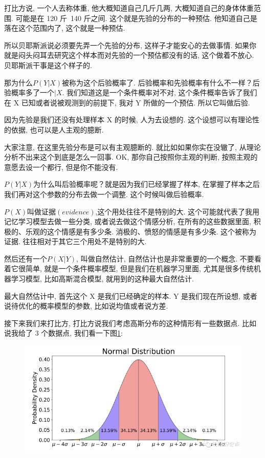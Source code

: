 打比方说, 一个人去称体重, 他大概知道自己几斤几两, 大概知道自己的身体体重范围. 可能是在 120 斤~140 斤之间. 这个就是先验的分布的一种预估. 他知道自己是落在这个范围内了, 这个就是一种预估. 

所以贝耶斯派说必须要先弄一个先验的分布, 这样子才能安心的去做事情. 如果你就是闷头闷耳去研究这个样本而对先验的一个预估都没有的话, 这个做着不放心. 贝耶斯派干事是这个样子的. 

那为什么$P(Y|X)$被称为这个后验概率了. 后验概率和先验概率有什么不一样？后验概率多了一个$|X$. 我们知道这是一个条件概率对不对, 这个条件概率告诉了我们在 X 已知或者说被观测到的前提下, 我对 Y 所做的一个预估. 所以它叫做后验. 

因为先验是我们还没有处理样本 X 的时候, 人为去设想的. 这个设想可以有理论性的依据, 也可以是人主观的臆断. 

大家注意, 在这里先验分布是可以有主观臆断的. 就比如如果你实在没辙了, 从理论分析不出来这个到底是怎么一回事. OK, 那你自己按照你主观的判断, 按照主观的意愿去设一个都行, 但是你不能没有. 

$P(Y|X)$为什么叫后验概率呢？就是因为我们已经掌握了样本, 在掌握了样本之后
我们再对这个参数的分布去做一个调整. 这个时候叫做后验概率. 

$P(X)$叫做证据$(\mathord{evidence})$,这个用处往往不是特别的大. 这个可能就代表了我用记忆学习模型去做一些分类, 或者说去做这个情感分析, 在所有的这些数据里面, 积极的、乐观的这个情感是有多少条. 消极的、愤怒的情感是有多少条. 这个被称为证据. 往往相对于其它三个用处不是特别的大. 

然后还有一个$P(X|Y)$, 叫做自然估计, 自然估计也是非常重要的一个概念. 不要看着它很简单, 就是一个条件概率模型, 但是我们在机器学习里面, 尤其是很多传统机器学习模型, 比如高斯混合模型, 就用到的这种最大自然估计. 

最大自然估计中, 首先这个 X 是我们已经确定的样本. Y 是我们现在所设想, 或者说待优化的概率模型的参数, 比如说均值或者说方差. 

接下来我们来打比方, 打比方说我们考虑高斯分布的这种情形有一些数据点. 比如说我给了 3 个数据点, 我们看一下图\ref{fig:img23_1}: 

\begin{figure}[ht]
  \centering
  \includegraphics[width=1\linewidth]{asset/20231227144618.png}
  \caption{}
  \label{fig:img23_1}
\end{figure}

